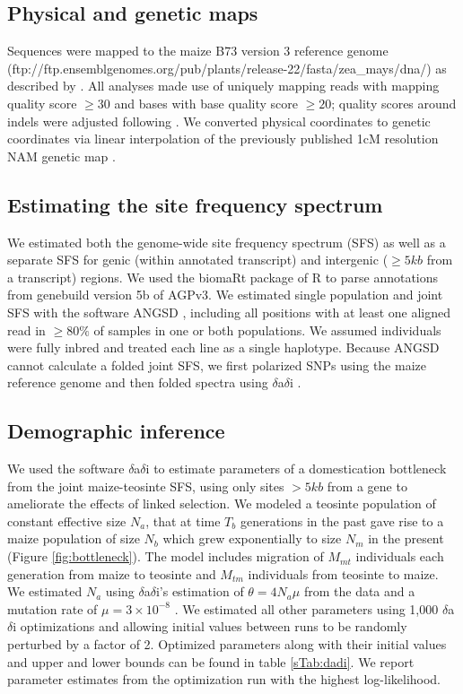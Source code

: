 \documentclass[twoside, twocolumn, letterpaper]{article}
\begin{document}
\subsection*{Physical and genetic maps}
Sequences were mapped to the maize B73 version 3 reference genome \cite{schnable2009} (ftp://ftp.ensemblgenomes.org/pub/plants/release-22/fasta/zea\_mays/dna/) as described by \cite{bukowski2015}. 
All analyses made use of uniquely mapping reads with mapping quality score $\geq  30$ and bases with base quality score $\geq 20$; quality scores around indels were adjusted following \cite{li2011statistical}.
We converted physical coordinates to genetic coordinates via linear interpolation of the previously published 1cM resolution NAM genetic map \cite{glaubitz2014}. 

\subsection*{Estimating the site frequency spectrum}
We estimated both the genome-wide site frequency spectrum (SFS) as well as a separate SFS for genic (within annotated transcript) and intergenic ($\geq 5kb$ from a transcript) regions. 
We used the biomaRt package \cite{durinck2009,durinck2005} of R \cite{R2014} to parse annotations from genebuild version 5b of AGPv3. 
We estimated single population and joint SFS with the software ANGSD \cite{korneliussen2014}, including all positions with at least one aligned read in $\geq 80\%$ of samples in one or both populations.
We assumed individuals were fully inbred and treated each line as a single haplotype. Because ANGSD cannot calculate a folded joint SFS, we first polarized SNPs using the maize reference genome and then folded spectra using $\delta$a$\delta$i \cite{gutenkunst2009}.

\subsection*{Demographic inference}
We used the software $\delta$a$\delta$i \cite{gutenkunst2009} to estimate parameters of a domestication bottleneck from the joint maize-teosinte SFS, using only sites $>5 kb$ from a gene to ameliorate the effects of linked selection.
We modeled a teosinte population of constant effective size $N_a$, that at time $T_b$ generations in the past gave rise to a maize population of size $N_b$ which grew exponentially to size $N_m$ in the present (Figure \ref{fig:bottleneck}).
The model includes migration of $M_{mt}$ individuals each generation from maize to teosinte and $M_{tm}$ individuals from teosinte to maize.  We estimated $N_a$ using $\delta$a$\delta$i's estimation of $\theta=4N_a\mu$ from the data and a mutation rate of $\mu = 3 \times 10^{-8}$ \cite{clark2005}. 
We estimated all other parameters using 1,000 $\delta$a$\delta$i optimizations and allowing initial values between runs to be randomly perturbed by a factor of 2.  
Optimized parameters along with their initial values and upper and lower bounds can be found in table \ref{sTab:dadi}. We report parameter estimates from the optimization run with the highest log-likelihood.
\end{document}
